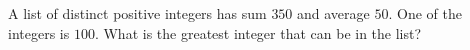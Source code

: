 A list of distinct positive integers has sum $350$ and average $50$. One of the integers is $100$. What is the greatest integer that can be in the list?
